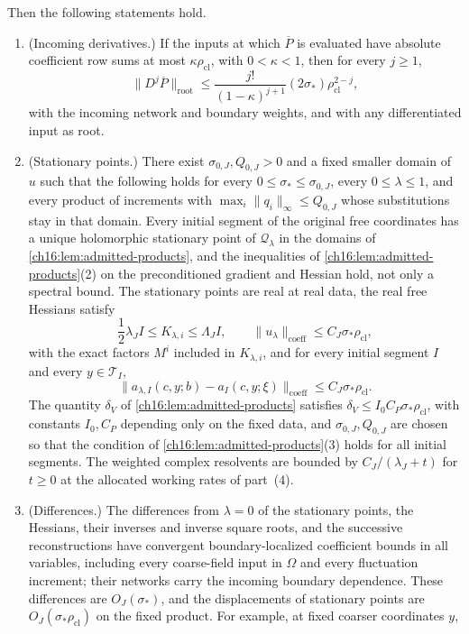 \begin{theorem}
Then the following statements hold.
\begin{enumerate}
\item (Incoming derivatives.) If the inputs at which $\overline P$ is evaluated have absolute coefficient row sums at most $\kappa\rho_{\mathrm{cl}}$, with $0<\kappa<1$, then for every $j\ge1$,
\[
 \|D^j\overline P\|_{\mathrm{root}}
 \le\frac{j!}{(1-\kappa)^{j+1}}
                (2\sigma_*)\rho_{\mathrm{cl}}^{2-j},
\]
with the incoming network and boundary weights, and with any differentiated input as root.
\item (Stationary points.) There exist $\sigma_{0,J},Q_{0,J}>0$ and a fixed smaller domain of $u$ such that the following holds for every $0\le\sigma_*\le\sigma_{0,J}$, every $0\le\lambda\le1$, and every product of increments with $\max_i\|q_i\|_\infty\le Q_{0,J}$ whose substitutions stay in that domain. Every initial segment of the original free coordinates has a unique holomorphic stationary point of $\mathcal Q_\lambda$ in the domains of \cref{ch16:lem:admitted-products}, and the inequalities of \cref{ch16:lem:admitted-products}(2) on the preconditioned gradient and Hessian hold, not only a spectral bound. The stationary points are real at real data, the real free Hessians satisfy
\[
 \frac12\lambda_J I\le K_{\lambda,i}\le\Lambda_J I,
 \qquad\|u_\lambda\|_{\mathrm{coeff}}
                                \le C_J\sigma_*\rho_{\mathrm{cl}},
\]
with the exact factors $M^i$ included in $K_{\lambda,i}$, and for every initial segment $I$ and every $y\in\mathcal T_I$,
\[
 \|a_{\lambda,I}(c,y;b)-a_I(c,y;\xi)\|_{\mathrm{coeff}}
                       \le C_J\sigma_*\rho_{\mathrm{cl}}.
\]
The quantity $\delta_V$ of \cref{ch16:lem:admitted-products} satisfies $\delta_V\le I_0C_P\sigma_*\rho_{\mathrm{cl}}$, with constants $I_0,C_P$ depending only on the fixed data, and $\sigma_{0,J},Q_{0,J}$ are chosen so that the condition of \cref{ch16:lem:admitted-products}(3) holds for all initial segments. The weighted complex resolvents are bounded by $C_J/(\lambda_J+t)$ for $t\ge0$ at the allocated working rates of part~(4).
\item (Differences.) The differences from $\lambda=0$ of the stationary points, the Hessians, their inverses and inverse square roots, and the successive reconstructions have convergent boundary-localized coefficient bounds in all variables, including every coarse-field input in $\Omega$ and every fluctuation increment; their networks carry the incoming boundary dependence. These differences are $O_J(\sigma_*)$, and the displacements of stationary points are $O_J(\sigma_*\rho_{\mathrm{cl}})$ on the fixed product. For example, at fixed coarser coordinates $y$,

\end{enumerate}
\end{theorem}
